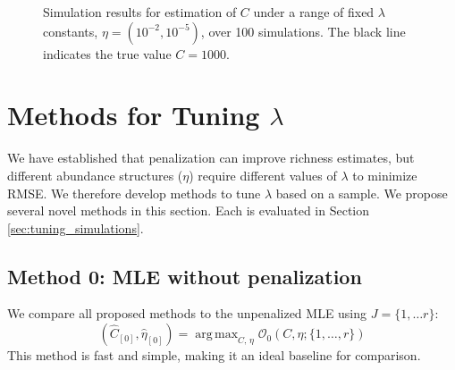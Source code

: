 \documentclass[12pt]{article}
\DeclareMathOperator*{\argmax}{arg\,max}
\theoremstyle{break}
\theoremstyle{break}
\begin{document}
\begin{figure}[p]
\caption{Simulation results for estimation of $C$ under a range of fixed $\lambda$ constants, $\eta = (10^{-2}, 10^{-5})$, over 100 simulations.  The black line indicates the true value $C = 1000$.
\label{fig:fixed_lambda_2}}
\centering{}
\end{figure}


%
%
%
\section{Methods for Tuning $\lambda$}
\label{sec:tuning_proposals}

We have established that penalization can improve richness estimates, but different abundance structures ($\eta$) require different values of $\lambda$ to minimize RMSE. We therefore develop methods to tune $\lambda$ based on a sample.  We propose several novel methods in this section.  Each is evaluated in Section \ref{sec:tuning_simulations}.

\setcounter{subsection}{-1}
\subsection{Method 0: MLE without penalization}

We compare all proposed methods to the unpenalized MLE using $J = \{1, \dots r \}$:
\begin{equation}
\left(\widehat{C}_{[0]},  \widehat{\eta}_{[0]} \right) = \argmax_{C, \, \eta}  \mathcal{O}_{0}\left(C, \eta ; \{1, \dots , r\} \right) \label{eq:c_hat_0}
\end{equation}
This method is fast and simple, making it an ideal baseline for comparison.
\end{document}
